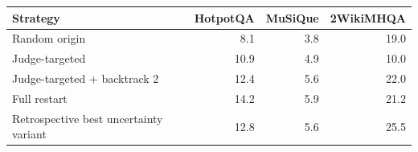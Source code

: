 \begin{tabular}{@{}lrrr@{}}
\toprule
Strategy & HotpotQA & MuSiQue & 2WikiMHQA \\
\midrule
Random origin & 8.1 & 3.8 & 19.0 \\
Judge-targeted & 10.9 & 4.9 & 10.0 \\
Judge-targeted + backtrack 2 & 12.4 & 5.6 & 22.0 \\
Full restart & 14.2 & 5.9 & 21.2 \\
\midrule
Retrospective best uncertainty variant & 12.8 & 5.6 & 25.5 \\
\bottomrule
\end{tabular}
